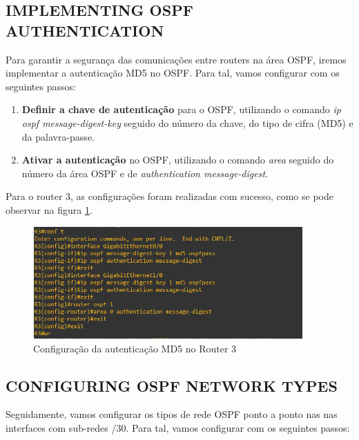 \documentclass[11pt,english, openright, oneside]{book}
\begin{document}
\newpage
\subsection{IMPLEMENTING OSPF AUTHENTICATION}
\vspace{0.2cm}

Para garantir a segurança das comunicações entre routers na área OSPF, iremos implementar a autenticação MD5 no OSPF. Para tal, vamos configurar com os seguintes passos:
\vspace{0.2cm}

\begin{enumerate}
  \item \textbf{Definir a chave de autenticação} para o OSPF, utilizando o comando \textit{ip ospf message-digest-key} seguido do número da chave, do tipo de cifra (MD5) e da palavra-passe.
  \item \textbf{Ativar a autenticação} no OSPF, utilizando o comando \textit{area} seguido do número da área OSPF e de \textit{authentication message-digest}.
\end{enumerate}
\vspace{0.2cm}

Para o router 3, as configurações foram realizadas com sucesso, como se pode observar na figura \ref{fig:config7}.

\begin{figure}[H]
    \centering
    \includegraphics[width=0.92\textwidth]{imagens/Tarefa2/6.ospf_auth.png}
    \caption{Configuração da autenticação MD5 no Router 3}
    \label{fig:config7}
\end{figure}

\newpage
\subsection{CONFIGURING OSPF NETWORK TYPES}
\vspace{0.2cm}

Seguidamente, vamos configurar os tipos de rede OSPF ponto a ponto nas nas interfaces com sub-redes /30. Para tal, vamos configurar com os seguintes passos:
\end{document}

